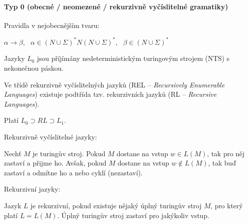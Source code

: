 \paragraph*{Typ 0 (obecné / neomezené / rekurzivně vyčíslitelné gramatiky)} \begin{compactitem}
    \item Pravidla v nejobecnějším tvaru: \begin{compactitem}
        \item $\alpha \rightarrow \beta,~~~ \alpha \in (N \cup \Sigma)^* N (N \cup \Sigma)^*,~~~ \beta \in (N \cup \Sigma)^*$
    \end{compactitem}

    \item Jazyky $L_0$ jsou příjímány nedeterministickým turingovým strojem (NTS) s nekonečnou páskou.

    \item Ve třídě rekurzivně vyčíslitelných jazyků (REL -- \textit{Recursively Enumerable Languages}) existuje podtřída tzv. rekurzivních jazyků (RL -- \textit{Recursive Languages}). \begin{compactitem}
        \item Platí $L_0 \supset RL \supset L_1$.

        \item Rekurzivně vyčíslitelné jazyky: \begin{compactitem}
            \item Nechť $M$ je turingův stroj. Pokud $M$ dostane na vstup $w \in L(M)$, tak pro něj zastaví a přijme ho. Avšak, pokud $M$ dostane na vstup $w \not\in L(M)$, tak buď zastaví a odmítne ho a nebo cyklí (nezastaví).
        \end{compactitem}

        \item Rekurzivní jazyky: \begin{compactitem}
            \item Jazyk $L$ je rekurzivní, pokud existuje nějaký úplný turingův stroj $M$, pro který platí $L = L(M)$. Úplný turingův stroj zastaví pro jakýkoliv vstup.
        \end{compactitem}
    \end{compactitem}
\end{compactitem}

